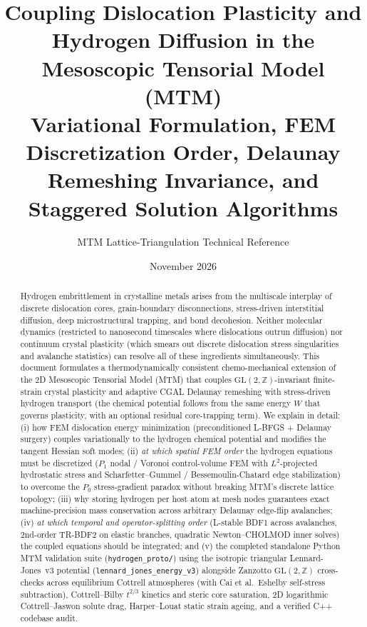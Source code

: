 \documentclass[11pt,a4paper]{article}
\title{\textbf{Coupling Dislocation Plasticity and Hydrogen Diffusion in the Mesoscopic Tensorial Model (MTM)}\\[6pt]
\large Variational Formulation, FEM Discretization Order, Delaunay Remeshing Invariance, and Staggered Solution Algorithms}
\author{MTM Lattice-Triangulation Technical Reference}
\date{November 2026}
\newcommand{\Z}{\mathbb{Z}}
\newcommand{\code}[1]{\texttt{#1}}
\begin{document}
\maketitle

\begin{abstract}
\noindent
Hydrogen embrittlement in crystalline metals arises from the multiscale interplay of discrete dislocation cores, grain-boundary disconnections, stress-driven interstitial diffusion, deep microstructural trapping, and bond decohesion. Neither molecular dynamics (restricted to nanosecond timescales where dislocations outrun diffusion) nor continuum crystal plasticity (which smears out discrete dislocation stress singularities and avalanche statistics) can resolve all of these ingredients simultaneously. This document formulates a thermodynamically consistent chemo-mechanical extension of the 2D Mesoscopic Tensorial Model (MTM) that couples $\mathrm{GL}(2,\Z)$-invariant finite-strain crystal plasticity and adaptive CGAL Delaunay remeshing with stress-driven hydrogen transport (the chemical potential follows from the same energy $W$ that governs plasticity, with an optional residual core-trapping term). We explain in detail: (i) how FEM dislocation energy minimization (preconditioned L-BFGS + Delaunay surgery) couples variationally to the hydrogen chemical potential and modifies the tangent Hessian soft modes; (ii) \emph{at which spatial FEM order} the hydrogen equations must be discretized ($P_1$ nodal / Voronoi control-volume FEM with $L^2$-projected hydrostatic stress and Scharfetter--Gummel / Bessemoulin-Chatard edge stabilization) to overcome the $P_0$ stress-gradient paradox without breaking MTM's discrete lattice topology; (iii) why storing hydrogen per host atom at mesh nodes guarantees exact machine-precision mass conservation across arbitrary Delaunay edge-flip avalanches; (iv) \emph{at which temporal and operator-splitting order} (L-stable BDF1 across avalanches, 2nd-order TR-BDF2 on elastic branches, quadratic Newton--CHOLMOD inner solves) the coupled equations should be integrated; and (v) the completed standalone Python MTM validation suite (\code{hydrogen\_proto/}) using the isotropic triangular Lennard-Jones~v3 potential (\code{lennard\_jones\_energy\_v3}) alongside Zanzotto $\mathrm{GL}(2,\Z)$ cross-checks across equilibrium Cottrell atmospheres (with Cai et al.\ Eshelby self-stress subtraction), Cottrell--Bilby $t^{2/3}$ kinetics and steric core saturation, 2D logarithmic Cottrell--Jaswon solute drag, Harper--Louat static strain ageing, and a verified C++ codebase audit.
\end{abstract}
\end{document}
